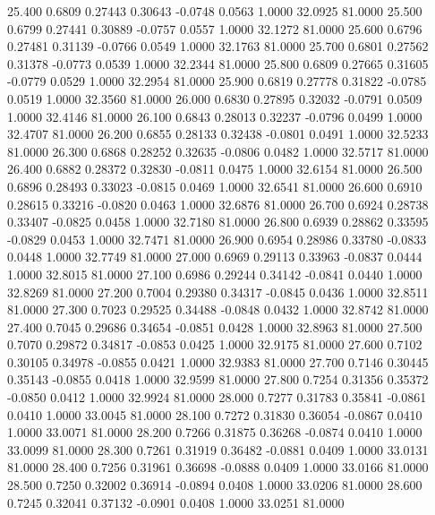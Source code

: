   25.400   0.6809   0.27443   0.30643  -0.0748   0.0563   1.0000  32.0925  81.0000
  25.500   0.6799   0.27441   0.30889  -0.0757   0.0557   1.0000  32.1272  81.0000
  25.600   0.6796   0.27481   0.31139  -0.0766   0.0549   1.0000  32.1763  81.0000
  25.700   0.6801   0.27562   0.31378  -0.0773   0.0539   1.0000  32.2344  81.0000
  25.800   0.6809   0.27665   0.31605  -0.0779   0.0529   1.0000  32.2954  81.0000
  25.900   0.6819   0.27778   0.31822  -0.0785   0.0519   1.0000  32.3560  81.0000
  26.000   0.6830   0.27895   0.32032  -0.0791   0.0509   1.0000  32.4146  81.0000
  26.100   0.6843   0.28013   0.32237  -0.0796   0.0499   1.0000  32.4707  81.0000
  26.200   0.6855   0.28133   0.32438  -0.0801   0.0491   1.0000  32.5233  81.0000
  26.300   0.6868   0.28252   0.32635  -0.0806   0.0482   1.0000  32.5717  81.0000
  26.400   0.6882   0.28372   0.32830  -0.0811   0.0475   1.0000  32.6154  81.0000
  26.500   0.6896   0.28493   0.33023  -0.0815   0.0469   1.0000  32.6541  81.0000
  26.600   0.6910   0.28615   0.33216  -0.0820   0.0463   1.0000  32.6876  81.0000
  26.700   0.6924   0.28738   0.33407  -0.0825   0.0458   1.0000  32.7180  81.0000
  26.800   0.6939   0.28862   0.33595  -0.0829   0.0453   1.0000  32.7471  81.0000
  26.900   0.6954   0.28986   0.33780  -0.0833   0.0448   1.0000  32.7749  81.0000
  27.000   0.6969   0.29113   0.33963  -0.0837   0.0444   1.0000  32.8015  81.0000
  27.100   0.6986   0.29244   0.34142  -0.0841   0.0440   1.0000  32.8269  81.0000
  27.200   0.7004   0.29380   0.34317  -0.0845   0.0436   1.0000  32.8511  81.0000
  27.300   0.7023   0.29525   0.34488  -0.0848   0.0432   1.0000  32.8742  81.0000
  27.400   0.7045   0.29686   0.34654  -0.0851   0.0428   1.0000  32.8963  81.0000
  27.500   0.7070   0.29872   0.34817  -0.0853   0.0425   1.0000  32.9175  81.0000
  27.600   0.7102   0.30105   0.34978  -0.0855   0.0421   1.0000  32.9383  81.0000
  27.700   0.7146   0.30445   0.35143  -0.0855   0.0418   1.0000  32.9599  81.0000
  27.800   0.7254   0.31356   0.35372  -0.0850   0.0412   1.0000  32.9924  81.0000
  28.000   0.7277   0.31783   0.35841  -0.0861   0.0410   1.0000  33.0045  81.0000
  28.100   0.7272   0.31830   0.36054  -0.0867   0.0410   1.0000  33.0071  81.0000
  28.200   0.7266   0.31875   0.36268  -0.0874   0.0410   1.0000  33.0099  81.0000
  28.300   0.7261   0.31919   0.36482  -0.0881   0.0409   1.0000  33.0131  81.0000
  28.400   0.7256   0.31961   0.36698  -0.0888   0.0409   1.0000  33.0166  81.0000
  28.500   0.7250   0.32002   0.36914  -0.0894   0.0408   1.0000  33.0206  81.0000
  28.600   0.7245   0.32041   0.37132  -0.0901   0.0408   1.0000  33.0251  81.0000
